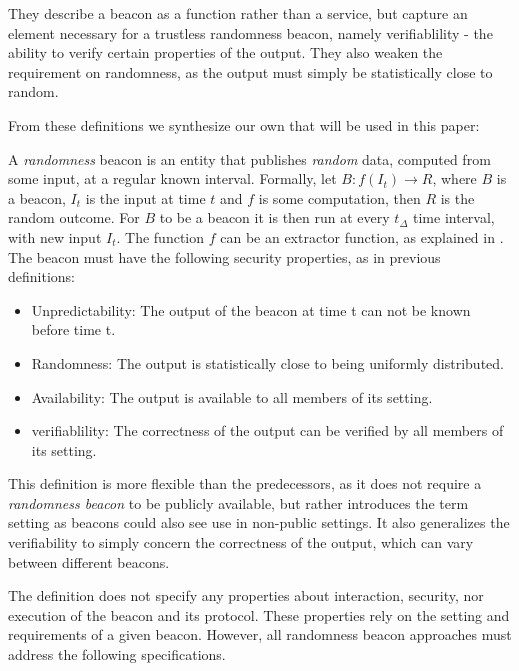 They describe a beacon as a function rather than a service, but capture an element necessary for a trustless randomness beacon, namely verifiablility - the ability to verify certain properties of the output. They also weaken the requirement on randomness, as the output must simply be statistically close to random. 

From these definitions we synthesize our own that will be used in this paper: 

A \emph{randomness} beacon is an entity that publishes \emph{random} data, computed from some input, at a regular known interval.
Formally, let $B: f(I_t) \rightarrow R$, where $B$ is a beacon, $I_t$ is the input at time $t$ and $f$ is some computation, then $R$ is the random outcome.
For $B$ to be a beacon it is then run at every $t_\Delta$ time interval, with new input $I_t$.
The function $f$ can be an extractor function, %
as explained in .
The beacon must have the following security properties, as in previous definitions: 

\begin{itemize}
    \item Unpredictability: The output of the beacon at time t can not be known before time t. 
    \item Randomness: The output is statistically close to being uniformly distributed. 
    \item Availability: The output is available to all members of its setting. 
    \item verifiablility: The correctness of the output can be verified by all members of its setting.  
\end{itemize}

This definition is more flexible than the predecessors, as it does not require a \emph{randomness beacon} to be publicly available, but rather introduces the term setting as beacons could also see use in non-public settings. It also generalizes the verifiability to simply concern the correctness of the output, which can vary between different beacons. 

The definition does not specify any properties about interaction, security, nor execution of the beacon and its protocol.
These properties rely on the setting and requirements of a given beacon.
However, all randomness beacon approaches must address the following specifications.


